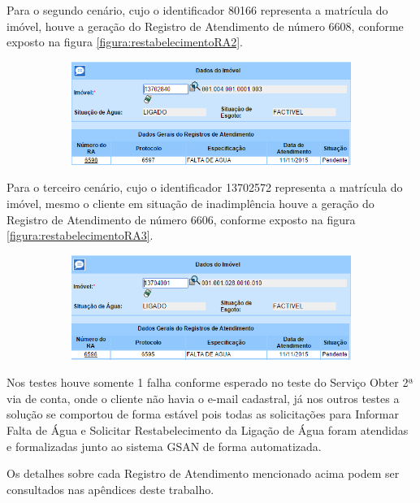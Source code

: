 Para o segundo cenário, cujo o identificador 80166 representa a matrícula do imóvel, houve a geração do Registro de Atendimento de número 6608, conforme exposto na figura \ref{figura:restabelecimentoRA2}.	

\begin{figure}[H]
	\centering
	\caption{Restabelecimento da Ligação de Água - RA gerado para o Cenário 2}
	\label{figura:restabelecimentoRA2}
	\begin{subfigure}[H]{\textwidth}
		\centering
		\includegraphics{figuras/cenarios/informar_falta_agua/resultado_2.PNG}
	\end{subfigure}
\end{figure}

	
Para o terceiro cenário, cujo o identificador 13702572 representa a matrícula do imóvel, mesmo o cliente em situação de inadimplência houve a geração do Registro de Atendimento de número 6606, conforme exposto na figura \ref{figura:restabelecimentoRA3}.	

\begin{figure}[H]
	\centering
	\caption{Restabelecimento da Ligação de Água - RA gerado para o Cenário 3}
	\label{figura:restabelecimentoRA3}
	\begin{subfigure}[H]{\textwidth}
		\centering
		\includegraphics{figuras/cenarios/informar_falta_agua/resultado_3.PNG}
	\end{subfigure}
\end{figure}


Nos testes houve somente 1 falha conforme esperado no teste do Serviço Obter 2ª via de conta, onde o cliente não havia o e-mail cadastral, já nos outros testes a solução se comportou de forma estável pois todas as solicitações para Informar Falta de Água e Solicitar Restabelecimento da Ligação de Água foram atendidas e formalizadas junto ao sistema GSAN de forma automatizada.

Os detalhes sobre cada Registro de Atendimento mencionado acima podem ser consultados nas apêndices deste trabalho.
